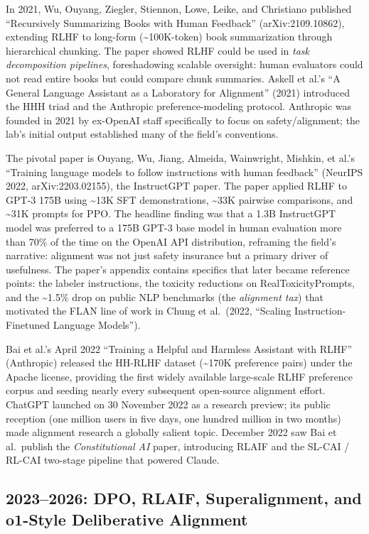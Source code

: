\documentclass{article}
\begin{document}
In 2021, Wu, Ouyang, Ziegler, Stiennon, Lowe, Leike, and Christiano published ``Recursively Summarizing Books with Human Feedback'' (arXiv:2109.10862), extending RLHF to long-form (\textasciitilde100K-token) book summarization through hierarchical chunking. The paper showed RLHF could be used in \emph{task decomposition pipelines}, foreshadowing scalable oversight: human evaluators could not read entire books but could compare chunk summaries. Askell et al.'s ``A General Language Assistant as a Laboratory for Alignment'' (2021) introduced the HHH triad and the Anthropic preference-modeling protocol. Anthropic was founded in 2021 by ex-OpenAI staff specifically to focus on safety/alignment; the lab's initial output established many of the field's conventions.

The pivotal paper is Ouyang, Wu, Jiang, Almeida, Wainwright, Mishkin, et al.'s ``Training language models to follow instructions with human feedback'' (NeurIPS 2022, arXiv:2203.02155), the InstructGPT paper. The paper applied RLHF to GPT-3 175B using \textasciitilde13K SFT demonstrations, \textasciitilde33K pairwise comparisons, and \textasciitilde31K prompts for PPO. The headline finding was that a 1.3B InstructGPT model was preferred to a 175B GPT-3 base model in human evaluation more than 70\% of the time on the OpenAI API distribution, reframing the field's narrative: alignment was not just safety insurance but a primary driver of usefulness. The paper's appendix contains specifics that later became reference points: the labeler instructions, the toxicity reductions on RealToxicityPrompts, and the \textasciitilde1.5\% drop on public NLP benchmarks (the \emph{alignment tax}) that motivated the FLAN line of work in Chung et al.~(2022, ``Scaling Instruction-Finetuned Language Models'').

Bai et al.'s April 2022 ``Training a Helpful and Harmless Assistant with RLHF'' (Anthropic) released the HH-RLHF dataset (\textasciitilde170K preference pairs) under the Apache license, providing the first widely available large-scale RLHF preference corpus and seeding nearly every subsequent open-source alignment effort. ChatGPT launched on 30 November 2022 as a research preview; its public reception (one million users in five days, one hundred million in two months) made alignment research a globally salient topic. December 2022 saw Bai et al.~publish the \emph{Constitutional AI} paper, introducing RLAIF and the SL-CAI / RL-CAI two-stage pipeline that powered Claude.

\subsection{2023--2026: DPO, RLAIF, Superalignment, and o1-Style Deliberative Alignment}\label{dpo-rlaif-superalignment-and-o1-style-deliberative-alignment}
\end{document}
